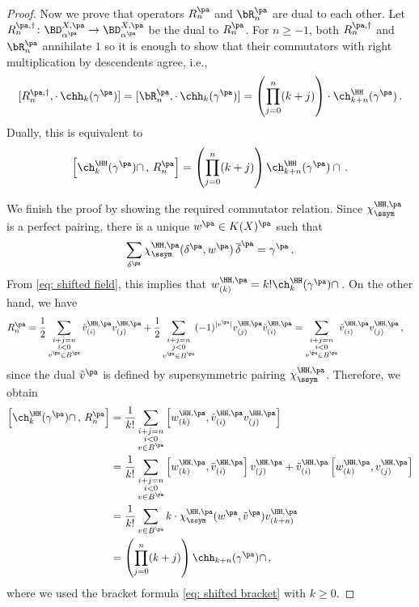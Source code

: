 \begin{proof}
Now we prove that operators $R_n^{\pa}$ and $\bR_n^{\pa}$ are dual to each other. Let $R_n^{{\pa}, \dagger}\colon \BD^{X,\pa}_{\alpha^{\pa}}\to \BD^{X,\pa}_{\alpha^{\pa}}$ be the dual to $R_n^{\pa}$. For $n\geq -1$, both $R_n^{{\pa}, \dagger}$ and $\bR_n^{\pa}$ annihilate $1$ so it is enough to show that their commutators with right multiplication by descendents agree, i.e.,
\[[R_n^{\pa, \dagger}, \cdot\,\chh_k(\gamma^{\pa})]=[\bR_n^{\pa}, \cdot\,\chh_k(\gamma^{\pa})]=\left(\prod_{j=0}^n(k+j)\right)\cdot\ch_{k+n}^\HH(\gamma^{\pa})\,.\]
Dually, this is equivalent to
\begin{equation*}
\left[\ch_k^{\HH}(\gamma^{\pa})\cap\,,\,R_n^{\pa}\right]=\left(\prod_{j=0}^n(k+j)\right)\ch_{k+n}^\HH(\gamma^{\pa})\cap\,.
\end{equation*}

We finish the proof by showing the required commutator relation. Since $\chi^{\HH,\pa}_{\ssym}$ is a perfect pairing, there is a unique $w^{\pa}\in K(X)^{\pa}$ such that
$$\sum_{\delta^{\pa}}\chi^{\HH,\pa}_{\ssym}(\delta^{\pa}, w^{\pa})\,\overline{\delta}^{\pa}=\gamma^{\pa}\,.
$$
From \eqref{eq: shifted field}, this implies that $w_{(k)}^{\HH,\pa}=k!\ch_k^\HH(\gamma^{\pa})\cap\,$. On the other hand, we have
\begin{align*}
    R_n^{\pa}
    &=\frac{1}{2}\sum_{\substack{ i+j=n\\ i<0\\ v^{\pa}\in B^{\pa}}}\tilde{v}^{\HH,\pa}_{(i)} v^{\HH,\pa}_{(j)}
    +\frac{1}{2}\sum_{\substack{ i+j=n\\ j<0 \\ v^{\pa}\in B^{\pa}}}(-1)^{|v^{\pa}|} v^{\HH,\pa}_{(j)}\tilde{v}^{\HH,\pa}_{(i)}
    =\sum_{\substack{ i+j=n\\ i<0\\ v^{\pa}\in B^{\pa}}}\tilde{v}^{\HH,\pa}_{(i)} v^{\HH,\pa}_{(j)}\,,
\end{align*}
since the dual $\tilde{v}^{\pa}$ is defined by supersymmetric pairing $\chi^{\HH,\pa}_{\ssym}$. Therefore, we obtain
\begin{align*}
    \left[\ch_k^{\HH}(\gamma^{\pa})\cap\,,\,R_n^{\pa}\right]
    &=\frac{1}{k!}\sum_{\substack{ i+j=n\\ i<0\\ v\in B^{\pa}}}
    \left[w_{(k)}^{\HH,\pa}, \tilde{v}^{\HH,\pa}_{(i)}v^{\HH,\pa}_{(j)}\right]\\
    &=\frac{1}{k!}\sum_{\substack{ i+j=n\\ i<0\\ v\in B^{\pa}}} \left[w^{\HH,\pa}_{(k)}, \tilde{v}^{\HH,\pa}_{(i)}\right]v^{\HH,\pa}_{(j)}+\tilde{v}^{\HH,\pa}_{(i)}\left[w^{\HH,\pa}_{(k)},v^{\HH,\pa}_{(j)}\right]\\
    &=\frac{1}{k!}\sum_{v\in B^{\pa}}k\cdot\chi^{\HH,\pa}_{\ssym}(w^{\pa},\tilde{v}^{\pa})v_{(k+n)}^{\HH,\pa}\\
    &=\left(\prod_{j=0}^n(k+j)\right)\chh_{k+n}(\gamma^{\pa})\cap\,,
\end{align*}
where we used the bracket formula \eqref{eq: shifted bracket} with $k\geq 0$.
\end{proof}

